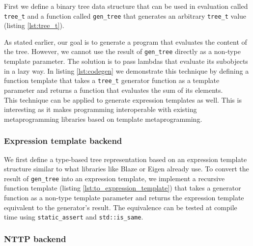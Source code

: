 \documentclass[../../main.tex]{subfiles}
\begin{document}
First we define a binary tree data structure that can be used in
\constexpr evaluation called \lstinline|tree_t| and a
\constexpr function called \lstinline|gen_tree| that generates an arbitrary
\lstinline|tree_t| value (listing \ref{lst:tree_t}).



As stated earlier, our goal is to generate a program that evaluates the content
of the tree. However, we cannot use the result of \lstinline|gen_tree| directly
as a non-type template parameter. The solution is to pass lambdas that evaluate
its subobjects in a lazy way. In listing \ref{lst:codegen} we demonstrate this
technique by defining a function template that takes a \lstinline|tree_t|
generator function as a template parameter and returns a function that evaluates
the sum of its elements.\\

This technique can be applied to generate expression templates as well.
This is interesting as it makes \constexpr programming interoperable with
existing metaprogramming libraries based on template metaprogramming.



\subsubsection{Expression template backend}

We first define a type-based tree representation based on an expression template
structure similar to what libraries like Blaze\cite{blazelib} or
Eigen\cite{eigen} already use. To convert the result of \lstinline|gen_tree|
into an expression template, we implement a recursive
function template (listing \ref{lst:to_expression_template}) that takes a
generator function as a non-type template parameter and returns the expression
template equivalent to the generator's result. The equivalence can be tested
at compile time using \lstinline|static_assert| and \lstinline|std::is_same|.

\subsubsection{NTTP backend}
\end{document}
